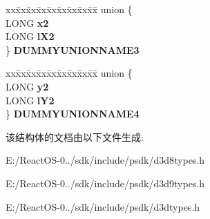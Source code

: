 \begin{DoxyCompactItemize}
\begin{tabbing}
\end{tabbing}\item 
\mbox{\label{struct___d3_d_r_e_c_t_a0464a9995b039e43ae66102d6cfaf4c6}} 
\begin{tabbing}
xx\=xx\=xx\=xx\=xx\=xx\=xx\=xx\=xx\=\kill
union \{\\
\>LONG {\bfseries x2}\\
\>LONG {\bfseries lX2}\\
\} {\bfseries DUMMYUNIONNAME3}\\

\end{tabbing}\item 
\mbox{\label{struct___d3_d_r_e_c_t_adc7c31586a60aab83cd44ec44f46b695}} 
\begin{tabbing}
xx\=xx\=xx\=xx\=xx\=xx\=xx\=xx\=xx\=\kill
union \{\\
\>LONG {\bfseries y2}\\
\>LONG {\bfseries lY2}\\
\} {\bfseries DUMMYUNIONNAME4}\\

\end{tabbing}\end{DoxyCompactItemize}


该结构体的文档由以下文件生成\+:\begin{DoxyCompactItemize}
\item 
E\+:/\+React\+O\+S-\/0../sdk/include/psdk/d3d8types.\+h\item 
E\+:/\+React\+O\+S-\/0../sdk/include/psdk/d3d9types.\+h\item 
E\+:/\+React\+O\+S-\/0../sdk/include/psdk/d3dtypes.\+h\end{DoxyCompactItemize}
